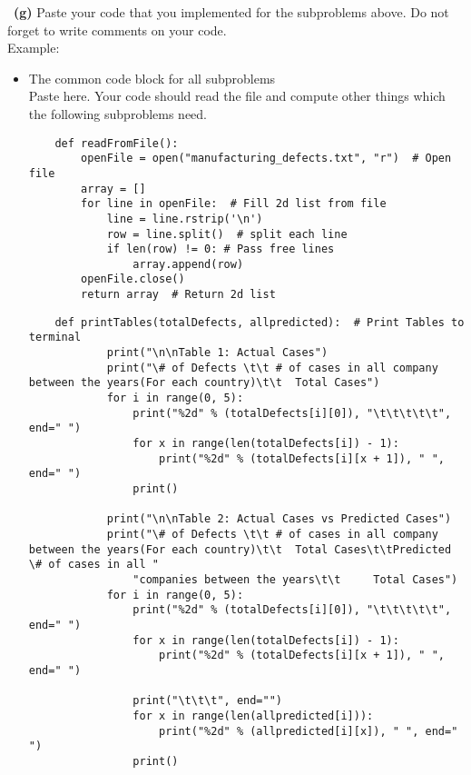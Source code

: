 \documentclass[a4 paper]{article}
\numberwithin{equation}{section}
\newcommand{\subproblem}[1]{~\newline\textbf{(#1)}}
\newcommand{\0}{\mathbf{0}}
\begin{document}
	\subproblem{g} Paste your code that you implemented for the subproblems above. Do not forget to write comments on your code.\\
	Example:\\
	\begin{itemize}
		\item The common code block for all subproblems\\
		Paste here. Your code should read the file and compute other things which the following subproblems need.   
		\begin{lstlisting}
    def readFromFile():
        openFile = open("manufacturing_defects.txt", "r")  # Open file
        array = []
        for line in openFile:  # Fill 2d list from file
            line = line.rstrip('\n')
            row = line.split()  # split each line
            if len(row) != 0: # Pass free lines
                array.append(row)
        openFile.close()
        return array  # Return 2d list
        \end{lstlisting}
        \begin{lstlisting}
    def printTables(totalDefects, allpredicted):  # Print Tables to terminal
            print("\n\nTable 1: Actual Cases")
            print("\# of Defects \t\t # of cases in all company between the years(For each country)\t\t  Total Cases")
            for i in range(0, 5):
                print("%2d" % (totalDefects[i][0]), "\t\t\t\t\t", end=" ")
                for x in range(len(totalDefects[i]) - 1):
                    print("%2d" % (totalDefects[i][x + 1]), " ", end=" ")
                print()
        
            print("\n\nTable 2: Actual Cases vs Predicted Cases")
            print("\# of Defects \t\t # of cases in all company between the years(For each country)\t\t  Total Cases\t\tPredicted \# of cases in all "
                "companies between the years\t\t     Total Cases")
            for i in range(0, 5):
                print("%2d" % (totalDefects[i][0]), "\t\t\t\t\t", end=" ")
                for x in range(len(totalDefects[i]) - 1):
                    print("%2d" % (totalDefects[i][x + 1]), " ", end=" ")
        
                print("\t\t\t", end="")
                for x in range(len(allpredicted[i])):
                    print("%2d" % (allpredicted[i][x]), " ", end=" ")
                print()
        

\end{lstlisting}
\end{itemize}
\end{document}
